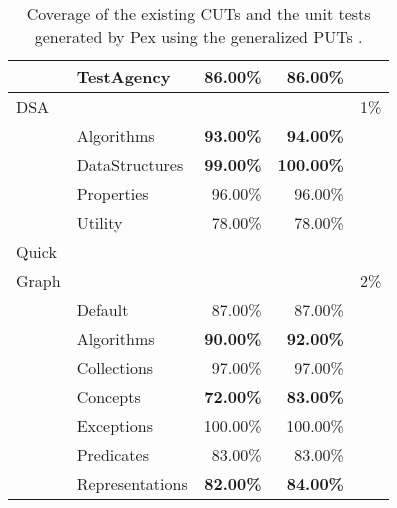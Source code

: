 \begin{table}[t]
\begin{tabular}{|l|l|r|r|c|}
						& TestAgency 							&  86.00\%					&  86.00\%					& 		\\ \cline{2-4}
\hline
\hline
DSA 				& \multicolumn{3}{|c|}{} 																					& 1\% \\ \hline
						& Algorithms							& \textbf{93.00\%}	&  \textbf{94.00\%}	& 		\\ \cline{2-4}
						& DataStructures					& \textbf{99.00\%}	& \textbf{100.00\%}	&			\\ \cline{2-4}
						& Properties							& 96.00\%						&  96.00\%					& 		\\ \cline{2-4}
						& Utility 								& 78.00\% 					&  78.00\%					&			\\ \cline{2-4}
\hline
\hline
Quick				& \multicolumn{3}{|c|}{} 														  						&			\\ 
Graph				& \multicolumn{3}{|c|}{} 																					&	2\%	\\ \hline
						& Default									& 87.00\%						&  87.00\%					& 		\\ \cline{2-4}
						& Algorithms							& \textbf{90.00\%}	&  \textbf{92.00\%}	&			\\ \cline{2-4}
						& Collections							& 97.00\%						&  97.00\%					& 		\\ \cline{2-4}
						& Concepts 								& \textbf{72.00\%} 	&  \textbf{83.00\%}	&			\\ \cline{2-4}
						& Exceptions 							&100.00\% 					& 100.00\%					&			\\ \cline{2-4}
						& Predicates 							& 83.00\% 					&  83.00\%					&			\\ \cline{2-4}
						& Representations					& \textbf{82.00\%}	&  \textbf{84.00\%} &			\\ \cline{2-4}
\hline
\hline
\end{tabular}
\caption{Coverage of the existing CUTs and the unit tests generated by Pex using the generalized PUTs .} \vspace*{-3ex}
\label{tab:coverage}
\end{table}

